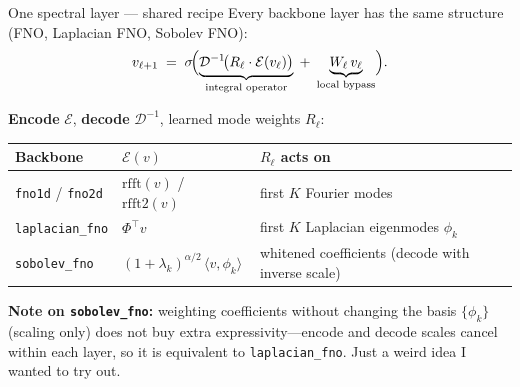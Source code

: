 \documentclass[aspectratio=169,11pt]{beamer}
\begin{document}
\begin{frame}{One spectral layer --- shared recipe}
  \small
  Every backbone layer has the same structure (FNO, Laplacian FNO, Sobolev FNO):
  \[
    v_{\ell+1} \;=\; \sigma\!\Bigl(
      \underbrace{\mathcal{D}^{-1}\!\bigl(R_\ell \cdot \mathcal{E}(v_\ell)\bigr)}_{\text{integral operator}}
      \;+\;
      \underbrace{W_\ell\, v_\ell}_{\text{local bypass}}
    \Bigr).
  \]

  \vspace{0.35em}
  \textbf{Encode} $\mathcal{E}$, \textbf{decode} $\mathcal{D}^{-1}$, learned mode weights $R_\ell$:

  \vspace{0.2em}
  \begin{table}
    \centering
    \begin{tabular}{@{}lll@{}}
      \toprule
      \textbf{Backbone} & $\mathcal{E}(v)$ & $R_\ell$ acts on \\
      \midrule
      \texttt{fno1d} / \texttt{fno2d} &
      $\mathrm{rfft}(v)$ / $\mathrm{rfft2}(v)$ &
      first $K$ Fourier modes \\
      \texttt{laplacian\_fno} &
      $\Phi^\top v$ &
      first $K$ Laplacian eigenmodes $\phi_k$ \\
      \texttt{sobolev\_fno} &
      $(1{+}\lambda_k)^{\alpha/2}\,\langle v,\phi_k\rangle$ &
      whitened coefficients (decode with inverse scale) \\
      \bottomrule
    \end{tabular}
  \end{table}

  \vspace{0.25em}
  \footnotesize
  \textbf{Note on \texttt{sobolev\_fno}:} weighting coefficients without changing the basis $\{\phi_k\}$ (scaling only) does not buy extra expressivity---encode and decode scales cancel within each layer, so it is equivalent to \texttt{laplacian\_fno}. Just a weird idea I wanted to try out.

  \normalsize
\end{frame}
\end{document}
